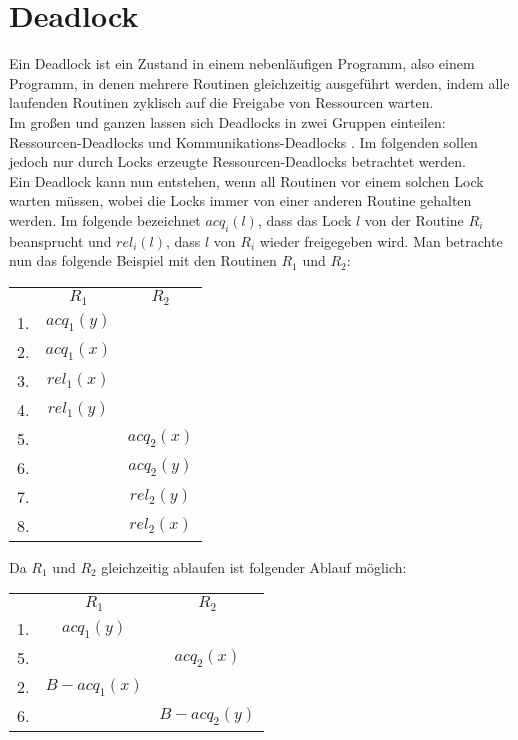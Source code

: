 \section{Deadlock} \label{Kap::Theo:Deadlocks}
Ein Deadlock ist ein Zustand in einem nebenläufigen Programm, also einem 
Programm, in denen mehrere Routinen gleichzeitig ausgeführt werden, indem alle 
laufenden Routinen zyklisch auf die Freigabe von Ressourcen warten.\\
Im großen und ganzen lassen sich Deadlocks in zwei Gruppen einteilen: 
Ressourcen-Deadlocks und Kommunikations-Deadlocks \cite{zhou}.
Im folgenden sollen jedoch nur durch Locks erzeugte Ressourcen-Deadlocks 
betrachtet werden.\\
Ein Deadlock kann nun entstehen, wenn all Routinen vor einem solchen Lock warten 
müssen, wobei die Locks immer von einer anderen Routine gehalten werden. 
Im folgende bezeichnet $acq_i(l)$, dass das Lock $l$ von der Routine $R_i$ 
beansprucht und $rel_i(l)$, dass $l$ von $R_i$ wieder freigegeben wird. 
Man betrachte nun das folgende Beispiel \cite{sulzmann} mit den Routinen 
$R_1$ und $R_2$:
\begin{table}[H]
    \centering
    \begin{tabular}{ccc}
       & $R_1$        & $R_2$          \\
    1. & $acq_{1}(y)$ &                \\
    2. & $acq_{1}(x)$ &                \\
    3. & $rel_{1}(x)$ &                \\
    4. & $rel_{1}(y)$ &                \\
    5. &              & $acq_{2}(x)$ \\
    6. &              & $acq_{2}(y)$ \\
    7. &              & $rel_{2}(y)$ \\
    8. &              & $rel_{2}(x)$
    \end{tabular}
\end{table}
Da $R_1$ und $R_2$ gleichzeitig ablaufen ist folgender Ablauf möglich:
\begin{table}[H]
    \centering
    \begin{tabular}{ccc}
       & $R_1$          & $R_2$          \\
    1. & $acq_{1}(y)$ &                \\
    5. &                & $acq_{2}(x)$ \\
    2. & $B-acq_{1}(x)$ &                \\
    6. &                & $B-acq_{2}(y)$
    \end{tabular}
\end{table}
